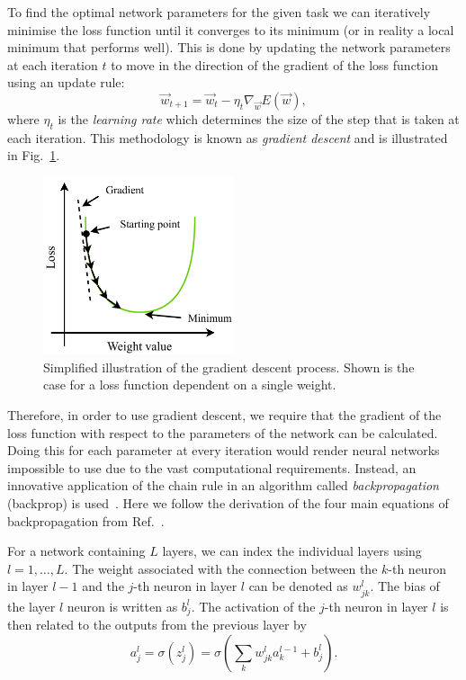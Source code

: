 To find the optimal network parameters for the given task we can iteratively minimise the loss
function until it converges to its minimum (or in reality a local minimum that performs well).
This is done by updating the network parameters at each iteration $t$ to move in the direction of
the gradient of the loss function using an update rule:
\begin{equation} %
    \vec{w}_{t+1}=\vec{w}_{t}-\eta_{t}\nabla_{\vec{w}}E(\vec{w}),
    \label{eq:update_rule}
\end{equation}
where $\eta_{t}$ is the \emph{learning rate} which determines the size of the step that is taken
at each iteration. This methodology is known as \emph{gradient descent} and is illustrated in
Fig.~\ref{fig:gradient_descent}.

\begin{figure} %
    \includegraphics[width=0.5\textwidth]{diagrams/6-cvn/gradient_descent.pdf}
    \caption[Illustration of the gradient descent process.]
    {Simplified illustration of the gradient descent process. Shown is the case for a loss
        function dependent on a single weight.}
    \label{fig:gradient_descent}
\end{figure}

Therefore, in order to use gradient descent, we require that the gradient of the loss function
with respect to the parameters of the network can be calculated. Doing this for each parameter at
every iteration would render neural networks impossible to use due to the vast computational
requirements. Instead, an innovative application of the chain rule in an algorithm called
\emph{backpropagation} (backprop) is used~\cite{werbos1974}. Here we follow the derivation of the
four main equations of backpropagation from Ref.~\cite{mehta2019}.

For a network containing $L$ layers, we can index the individual layers using $l=1,\dots,L$. The
weight associated with the connection between the $k$-th neuron in layer $l-1$ and the $j$-th
neuron in layer $l$ can be denoted as $w^{l}_{jk}$. The bias of the layer $l$ neuron is written as
$b^{l}_{j}$. The activation of the $j$-th neuron in layer $l$ is then related to the outputs from
the previous layer by
\begin{equation} %
    a^{l}_{j}=\sigma(z^{l}_{j})=\sigma\left(\sum_{k}w^{l}_{jk}a^{l-1}_{k}+b^{l}_{j}\right).
    \label{eq:feedforward}
\end{equation}

